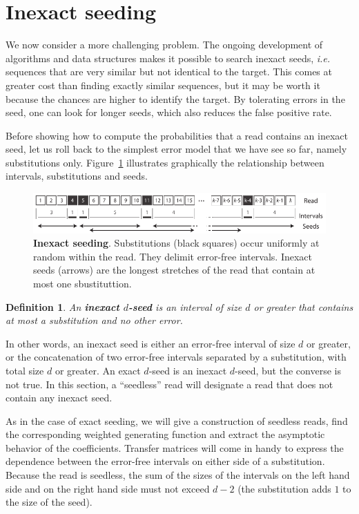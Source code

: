 \documentclass{article}
\newtheorem{definition}{Definition}
\begin{document}
\section{Inexact seeding}

We now consider a more challenging problem. The ongoing development of
algorithms and data structures makes it possible to search inexact seeds,
\textit{i.e.} sequences that are very similar but not identical to the
target. This comes at greater cost than finding exactly similar sequences,
but it may be worth it because the chances are higher to identify the
target. By tolerating errors in the seed, one can look for longer seeds,
which also reduces the false positive rate.

Before showing how to compute the probabilities that a read contains
an inexact seed, let us roll back to the simplest error model that we have
see so far, namely substitutions only. Figure~\ref{fig:sketchinexact}
illustrates graphically the relationship between intervals, substitutions
and seeds.

\begin{figure}[h]
\centering
\includegraphics[scale=0.88]{sketch_inexact_seeding.pdf}
\caption{\textbf{Inexact seeding}. Substitutions (black squares) occur
uniformly at random within the read. They delimit error-free intervals.
Inexact seeds (arrows) are the longest stretches of the read that contain
at most one sbustituttion.}
\label{fig:sketchinexact}
\end{figure}


\begin{definition}
\label{def:seed}
An \textbf{inexact $d$-seed} is an interval of size $d$ or greater that
contains at most a substitution and no other error.
\end{definition}

In other words, an inexact seed is either an error-free interval of size
$d$ or greater, or the concatenation of two error-free intervals separated
by a substitution, with total size $d$ or greater. An exact $d$-seed is an
inexact $d$-seed, but the converse is not true. In this section, a
``seedless'' read will designate a read that does not contain any inexact
seed.

As in the case of exact seeding, we will give a construction of seedless
reads, find the corresponding weighted generating function and extract the
asymptotic behavior of the coefficients. Transfer matrices will come in
handy to express the dependence between the error-free intervals on either
side of a substitution. Because the read is seedless, the sum of the sizes
of the intervals on the left hand side and on the right hand side must not
exceed $d-2$ (the substitution adds $1$ to the size of the seed).
\end{document}
